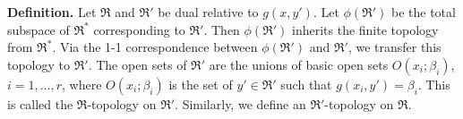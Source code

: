 \textbf{Definition.} Let $\mathfrak{R}$ and $\mathfrak{R}'$ be dual relative to $g(x, y')$. Let $\phi(\mathfrak{R}')$ be the total subspace of $\mathfrak{R}^*$ corresponding to $\mathfrak{R}'$. Then $\phi(\mathfrak{R}')$ inherits the finite topology from $\mathfrak{R}^*$. Via the 1-1 correspondence between $\phi(\mathfrak{R}')$ and $\mathfrak{R}'$, we transfer this topology to $\mathfrak{R}'$. The open sets of $\mathfrak{R}'$ are the unions of basic open sets $O(x_i; \beta_i)$, $i = 1, \ldots, r$, where $O(x_i; \beta_i)$ is the set of $y' \in \mathfrak{R}'$ such that $g(x_i, y') = \beta_i$. This is called the $\mathfrak{R}$-topology on $\mathfrak{R}'$. Similarly, we define an $\mathfrak{R}'$-topology on $\mathfrak{R}$.

